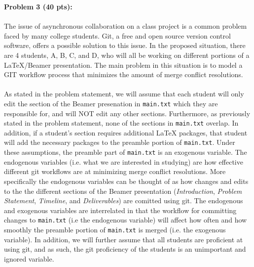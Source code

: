 \documentclass[12pt]{article}
\begin{document}
\newpage
\noindent\textbf{Problem 3 (40 pts):}

\paragraph{} The issue of asynchronous collaboration on a class project is a common problem faced by many college students. Git, a free and open source version control software, offers a possible solution to this issue. In the proposed situation, there are 4 students, A, B, C, and D, who will all be working on different portions of a LaTeX/Beamer presentation. The main problem in this situation is to model a GIT workflow process that minimizes the amount of merge conflict resolutions. 

\paragraph{} As stated in the problem statement, we will assume that each student will only edit the section of the Beamer presenation in \texttt{main.txt} which they are responsible for, and will NOT edit any other sections. Furthermore, as previously stated in the problem statement, none of the sections in \texttt{main.txt} overlap. In addition, if a student's section requires additional LaTeX packages, that student will add the necessary packages to the preamble portion of \texttt{main.txt}. Under these assumptions, the preamble part of \texttt{main.txt} is an exogenous variable. The endogenous variables (i.e. what we are interested in studying) are how effective different git workflows are at minimizing merge conflict resolutions. More specifically the endogenous variables can be thought of as how changes and edits to the the different sections of the Beamer presentation (\emph{Introduction}, \emph{Problem Statement}, \emph{Timeline}, and \emph{Deliverables}) are comitted using git. The endogenous and exogenous variables are interrelated in that the workflow for committing changes to \texttt{main.txt} (i.e the endogenous variable) will affect how often and how smoothly the preamble portion of \texttt{main.txt} is merged (i.e. the exogenous variable). In addition, we will further assume that all students are proficient at using git, and as such, the git proficiency of the students is an unimportant and ignored variable.
\end{document}
